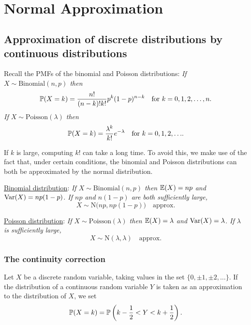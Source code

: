 \chapter{Normal Approximation}\label{chap:normal_approximation}

\section{Approximation of discrete distributions by continuous distributions}
Recall the PMFs of the binomial and Poisson distributions:
\bit
\it If $X\sim\text{Binomial}(n,p)$ then 
\[
\mathbb{P}(X=k)=\displaystyle\frac{n!}{(n-k)!k!} p^k(1-p)^{n-k} \text{\quad for $k=0,1,2,\ldots,n$}.
\]
\it If $X\sim\text{Poisson}(\lambda)$ then 
\[
\mathbb{P}(X=k)=\displaystyle\frac{\lambda^k}{k!}e^{-\lambda} \text{\quad for $k=0,1,2,\ldots$}.
\]
\eit

If $k$ is large, computing $k!$ can take a long time. To avoid this, we make use of the fact that, under certain conditions, the binomial and Poisson distributions can both be approximated by the normal distribution.

\underline{Binomial distribution}:
\bit
\it If $X\sim\text{Binomial}(n,p)$ then $\mathbb{E}(X)=np$ and $\text{Var}(X)=np(1-p)$.
\it If $np$ and $n(1-p)$ are both sufficiently large,
\[
X\sim\text{N}\big(np,np(1-p)\big)\quad\text{approx.}
\]
\eit

\vspace*{2ex}
\underline{Poisson distribution}:
\bit
\it If $X\sim\text{Poisson}(\lambda)$ then $\mathbb{E}(X)=\lambda$ and $\text{Var}(X)=\lambda$.
\it If $\lambda$ is sufficiently large,
\[
X\sim\text{N}(\lambda,\lambda)\quad\text{approx.}
\]
\eit

\subsection{The continuity correction}

\begin{definition}
Let $X$ be a discrete random variable, taking values in the set $\{0,\pm 1,\pm 2,\ldots\}$. If the distribution of a continuous random variable $Y$ is taken as an approximation to the distribution of $X$, we set
\[
\mathbb{P}(X=k) = \mathbb{P}\left(k - \frac{1}{2} < Y < k + \frac{1}{2}\right).
\] 
\end{definition}

